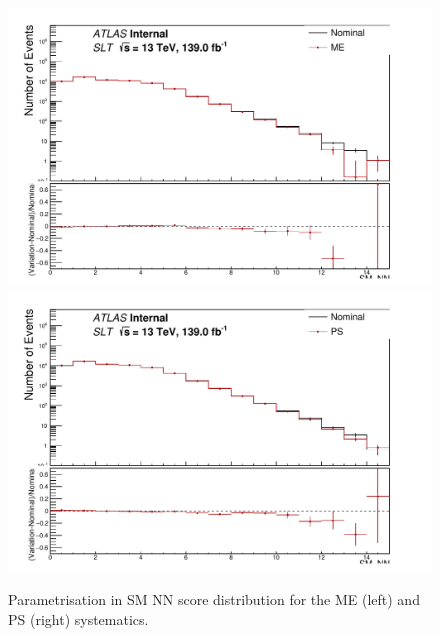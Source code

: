 

\begin{figure}
\centering
\includegraphics[width=.49\textwidth]{figures/lephad_modelling_systs/SLT/ME/limit_binning_SM_NN_Norm}
\includegraphics[width=.49\textwidth]{figures/lephad_modelling_systs/SLT/PS/limit_binning_SM_NN_Norm}\\
\caption{Parametrisation in SM NN score distribution for the ME (left) and PS (right) systematics.}
\label{fig:ttbarsyst_lephad_SLT_NN}
\end{figure}


  


